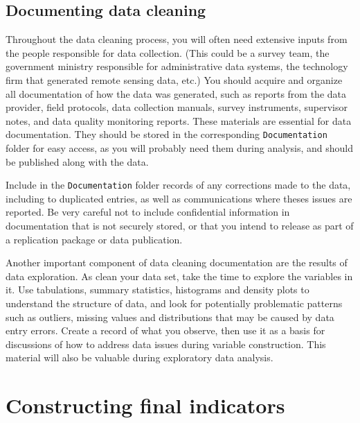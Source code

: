 \subsection{Documenting data cleaning}
Throughout the data cleaning process,
you will often need extensive inputs from the people responsible for data collection.
(This could be a survey team, the government ministry responsible for administrative data systems,
the technology firm that generated remote sensing data, etc.)
You should acquire and organize all documentation of how the data was generated, such as
reports from the data provider, field protocols, data collection manuals, survey instruments,
supervisor notes, and data quality monitoring reports.
These materials are essential for data documentation.
They should be stored in the corresponding \texttt{Documentation} folder for easy access,
as you will probably need them during analysis,
and should be published along with the data.

Include in the \texttt{Documentation} folder records of any
corrections made to the data, including to duplicated entries,
as well as communications where theses issues are reported.
Be very careful not to include confidential information in documentation that is not securely stored,
or that you intend to release as part of a replication package or data publication.

Another important component of data cleaning documentation are the results of data exploration.
As clean your data set, take the time to explore the variables in it.
Use tabulations, summary statistics, histograms and density plots to understand the structure of data,
and look for potentially problematic patterns such as outliers,
missing values and distributions that may be caused by data entry errors.
Create a record of what you observe,
then use it as a basis for discussions of how to address data issues during variable construction.
This material will also be valuable during exploratory data analysis.

\section{Constructing final indicators}


